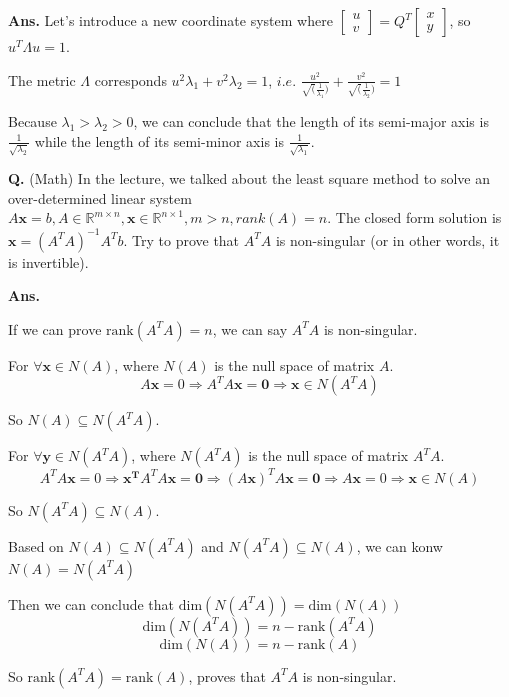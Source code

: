 \documentclass[12pt, a4paper, UTF8, fontset=windows]{ctexbook}
\newcounter{problemname}
\newenvironment{problem}{\begin{shaded}\stepcounter{problemname}\par\noindent\textbf{Q\arabic{problemname}.}}{\end{shaded}\par}
\newenvironment{solution}{\par\noindent\textbf{Ans.}}{\par}
\begin{document}
\begin{solution}
    Let's introduce a new coordinate system where $\begin{bmatrix} u \\ v \end{bmatrix} = Q^T \begin{bmatrix} x \\ y \end{bmatrix}$, so $u^T \Lambda u = 1$.

    The metric $\Lambda$ corresponds $u^2 \lambda_1 + v^2 \lambda_2 = 1$, $i.e.$ $\frac{u^2}{\sqrt(\frac{1}{\lambda_1})} + \frac{v^2}{\sqrt(\frac{1}{\lambda_2})}=1$

    Because $\lambda_1 > \lambda_2 > 0$, we can conclude that the length of its semi-major axis is $\frac{1}{\sqrt{\lambda_2}}$
    while the length of its semi-minor axis is $\frac{1}{\sqrt{\lambda_1}}$.
\end{solution} 


\begin{problem}
    (Math) In the lecture, we talked about the least square method to solve an
    over-determined linear system $A\mathbf{x} = b, A \in \mathbb{R}^{m \times n}, \mathbf{x} \in \mathbb{R}^{n \times 1}, m > n, rank(A)=n$.
    The closed form solution is $\mathbf{x} = (A^T A)^{-1}A^Tb$. Try to prove that $A^TA$ is non-singular (or in other
    words, it is invertible).
    
\end{problem}

\begin{solution}

    If we can prove $\text{rank}(A^TA)=n$, we can say $A^TA$ is non-singular.
    
    For $\forall{\textbf{x}} \in N(A)$, where $N(A)$ is the null space of matrix $A$.
    $$
    A\mathbf{x}=0
    \Rightarrow A^TA\mathbf{x} = \mathbf{0}
    \Rightarrow \mathbf{x} \in N(A^TA)
    $$

    So $N(A) \subseteq N(A^TA)$.

    For $\forall{\textbf{y}} \in N(A^TA)$, where $N(A^TA)$ is the null space of matrix $A^TA$.
    $$
    A^TA\mathbf{x}=0
    \Rightarrow \mathbf{x^T}A^TA\mathbf{x} = \mathbf{0}
    \Rightarrow (A\mathbf{x})^TA\mathbf{x} = \mathbf{0}
    \Rightarrow A\textbf{x} = 0
    \Rightarrow \mathbf{x} \in N(A)
    $$

    So $N(A^TA) \subseteq N(A)$.

    Based on $N(A) \subseteq N(A^TA)$ and $N(A^TA) \subseteq N(A)$, we can konw $N(A) = N(A^TA)$

    Then we can conclude that $\text{dim}(N(A^TA)) = \text{dim}(N(A))$
    $$\text{dim}(N(A^TA)) = n - \text{rank}(A^TA)$$ 
    $$\text{dim}(N(A)) = n - \text{rank}(A)$$

    So $\text{rank}(A^TA) = \text{rank}(A)$, proves that $A^TA$ is non-singular.
\end{solution} 
\end{document}
